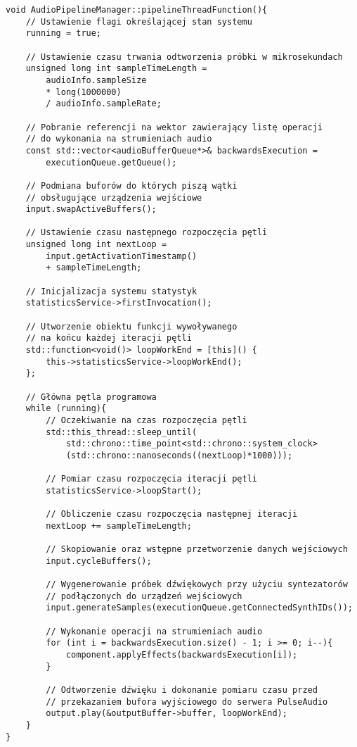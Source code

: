\begin{lstlisting}
void AudioPipelineManager::pipelineThreadFunction(){
    // Ustawienie flagi określającej stan systemu
    running = true;

    // Ustawienie czasu trwania odtworzenia próbki w mikrosekundach
    unsigned long int sampleTimeLength = 
        audioInfo.sampleSize
        * long(1000000)
        / audioInfo.sampleRate;

    // Pobranie referencji na wektor zawierający listę operacji
    // do wykonania na strumieniach audio
    const std::vector<audioBufferQueue*>& backwardsExecution = 
        executionQueue.getQueue();

    // Podmiana buforów do których piszą wątki
    // obsługujące urządzenia wejściowe
    input.swapActiveBuffers();

    // Ustawienie czasu następnego rozpoczęcia pętli
    unsigned long int nextLoop = 
        input.getActivationTimestamp() 
        + sampleTimeLength;

    // Inicjalizacja systemu statystyk
    statisticsService->firstInvocation();

    // Utworzenie obiektu funkcji wywoływanego
    // na końcu każdej iteracji pętli
    std::function<void()> loopWorkEnd = [this]() { 
        this->statisticsService->loopWorkEnd(); 
    };

    // Główna pętla programowa
    while (running){
        // Oczekiwanie na czas rozpoczęcia pętli
        std::this_thread::sleep_until(
            std::chrono::time_point<std::chrono::system_clock>
            (std::chrono::nanoseconds((nextLoop)*1000)));

        // Pomiar czasu rozpoczęcia iteracji pętli
        statisticsService->loopStart();

        // Obliczenie czasu rozpoczęcia następnej iteracji
        nextLoop += sampleTimeLength;

        // Skopiowanie oraz wstępne przetworzenie danych wejściowych
        input.cycleBuffers();

        // Wygenerowanie próbek dźwiękowych przy użyciu syntezatorów
        // podłączonych do urządzeń wejściowych
        input.generateSamples(executionQueue.getConnectedSynthIDs());

        // Wykonanie operacji na strumieniach audio
        for (int i = backwardsExecution.size() - 1; i >= 0; i--){
            component.applyEffects(backwardsExecution[i]);
        }

        // Odtworzenie dźwięku i dokonanie pomiaru czasu przed
        // przekazaniem bufora wyjściowego do serwera PulseAudio
        output.play(&outputBuffer->buffer, loopWorkEnd);
    }
}
\end{lstlisting}

